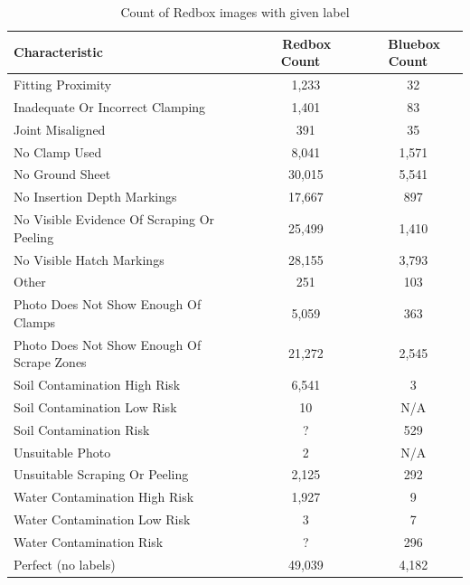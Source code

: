 \documentclass[a4paper,11pt]{article}
\begin{document}
\begin{table}[h]
   \centering
    \begin{tabular}{|l|c|c|}
    \hline
    Characteristic                              & ~ Redbox Count  & ~ Bluebox Count \\ \hline
    Fitting Proximity                           & ~  1,233        & ~ 32      \\
    Inadequate Or Incorrect Clamping            & ~ 1,401         & ~ 83      \\
    Joint Misaligned                            & ~ 391           & ~ 35      \\
    No Clamp Used                               & ~ 8,041         & ~ 1,571   \\
    No Ground Sheet                             & ~  30,015       & ~ 5,541   \\
    No Insertion Depth Markings                 & ~ 17,667        & ~ 897     \\
    No Visible Evidence Of Scraping Or Peeling  & ~ 25,499        & ~ 1,410   \\
    No Visible Hatch Markings                   & ~ 28,155        & ~ 3,793   \\
    Other                                       & ~  251          & ~ 103     \\
    Photo Does Not Show Enough Of Clamps        & ~ 5,059         & ~ 363     \\
    Photo Does Not Show Enough Of Scrape Zones  & ~ 21,272        & ~ 2,545   \\
    Soil Contamination High Risk                & ~ 6,541         & ~ 3       \\
    Soil Contamination Low Risk                 & ~ 10            & ~ N/A     \\
    Soil Contamination Risk                     & ~ ?             & ~ 529     \\
    Unsuitable Photo                            & ~ 2             & ~ N/A     \\
    Unsuitable Scraping Or Peeling              & ~ 2,125         & ~ 292     \\
    Water Contamination High Risk               & ~ 1,927         & ~ 9       \\
    Water Contamination Low Risk                & ~ 3             & ~ 7       \\
	Water Contamination Risk                    & ~ ?             & ~ 296     \\
     \hline
    Perfect (no labels)                         & ~ 49,039        & ~ 4,182   \\
    \hline
    \end{tabular}
    \caption {Count of Redbox images with given label}
\end{table} 
\end{document}
